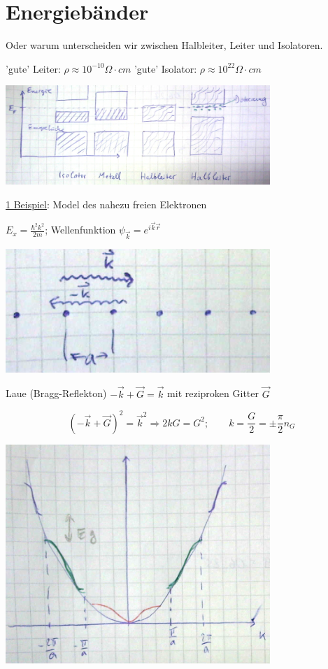 \chapter{Energiebänder}


Oder warum unterscheiden wir zwischen Halbleiter, Leiter und Isolatoren.

'gute' Leiter: \(\rho\approx 10^{-10}\Omega \cdot cm\)
'gute' Isolator:  \(\rho\approx 10^{22}\Omega \cdot cm\)

\includegraphics[width=0.75\textwidth]{kap06_31.png}

\underline{1 Beispiel}: Model des nahezu freien Elektronen

\(E_x=\frac{\hbar^2k^2}{2m}\); Wellenfunktion \(\psi_{\vec k} = e^{i\vec k\vec r}\)

\includegraphics[width=0.75\textwidth]{kap06_32.png}

Laue (Bragg-Reflekton) \(-\vec k+\vec G = \vec k\) mit reziproken Gitter \(\vec G\)

\[ (-\vec k +\vec G)^2 = \vec k^2 \Rightarrow 2kG = G^2; \qquad k=\frac{G}{2}=\pm \frac{\pi}{2}n_G\]

\includegraphics[width=0.75\textwidth]{kap06_33.png}

